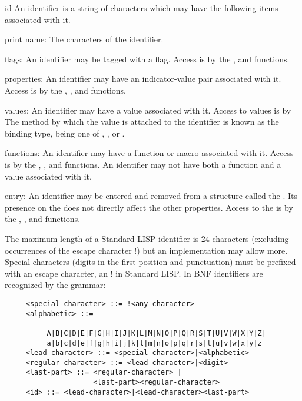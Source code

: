 \begin{Type}{id}
An identifier is a string of characters which may have the
following items associated with it.


     print name: The characters of the identifier.

     flags: An  identifier may  be  tagged with  a flag.    Access  is
          by  the ,  and  
           functions.

     properties: An  identifier  may  have  an   indicator-value  pair
          associated  with it.    Access  is  by the  
          , , and 
          functions.

     values: An identifier may have a value  associated with
          it.    Access to  values  is by   
          The method by  which the  value
          is attached  to  the identifier  is  known as  the  binding
          type, being one of 
          , ,
          or .

     functions:
          An identifier may have a function or macro associated  with
          it.    Access is  by the  
          , , and  functions.
          An identifier  may not  have both  a function  and a  value
          associated with it.


      entry: An  identifier may  be entered and  removed from  a
          structure called  the .  Its presence  on the  
          does not directly affect  the other properties.  Access  to
          the  is by the 
          , , and 
          functions.        

     The  maximum  length  of  a  Standard  LISP  identifier   is  24
     characters  (excluding occurrences  of the  escape character  !)
     but  an  implementation may  allow  more.    Special  characters
     (digits in the first position and punctuation) must  be prefixed
     with  an escape  character,  an !    in  Standard LISP.  In  BNF
     identifiers are recognized by the grammar:
\begin{verbatim}
     <special-character> ::= !<any-character>
     <alphabetic> ::=

          A|B|C|D|E|F|G|H|I|J|K|L|M|N|O|P|Q|R|S|T|U|V|W|X|Y|Z|
          a|b|c|d|e|f|g|h|i|j|k|l|m|n|o|p|q|r|s|t|u|v|w|x|y|z
     <lead-character> ::= <special-character>|<alphabetic>
     <regular-character> ::= <lead-character>|<digit>
     <last-part> ::= <regular-character> |
                     <last-part><regular-character>
     <id> ::= <lead-character>|<lead-character><last-part>


\end{verbatim}
\end{Type}
